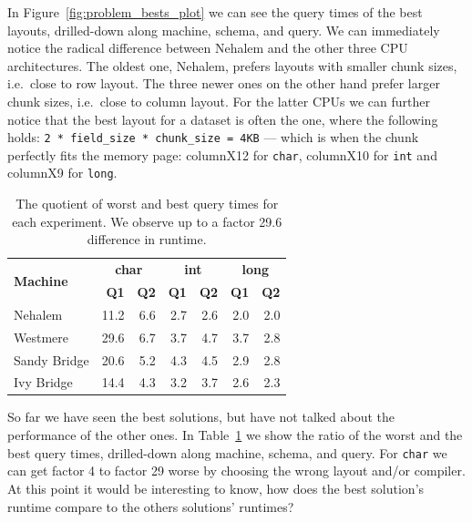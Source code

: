 \documentclass{sig-alternate}
\begin{document}
In Figure~\ref{fig:problem_bests_plot} we can see the query times of the best layouts, drilled-down along machine, schema, and query. We can immediately notice the radical difference between Nehalem and the other three CPU architectures. The oldest one, Nehalem, prefers layouts with smaller chunk sizes, i.e.~close to row layout. The three newer ones on the other hand prefer larger chunk sizes, i.e.~close to column layout. For the latter CPUs we can further notice that the best layout for a dataset is often the one, where the following holds: \texttt{2~* field\_size * chunk\_size = 4KB} --- which is when the chunk perfectly fits the memory page: columnX12 for \texttt{char}, columnX10 for \texttt{int} and columnX9 for \texttt{long}.

\begin{table}[!ht]
  \vspace{-10pt}
  \scriptsize
  \centering
  \begin{tabular}{| l || r | r | r | r | r | r |}
    \hline
\multirow{2}{*}{\bf Machine}  &  \multicolumn{2}{c|}{\bf char} &  \multicolumn{2}{c|}{\bf int} & \multicolumn{2}{c|}{\bf long} \\ \cline{2-7}
 & {\bf Q1} & {\bf Q2} & {\bf Q1} & {\bf Q2} & {\bf Q1} & {\bf Q2} \\ \hline \hline
Nehalem & 11.2 & 6.6 & 2.7 & 2.6 & 2.0 & 2.0 \\ \hline
Westmere & 29.6 & 6.7 & 3.7 & 4.7 & 3.7 & 2.8 \\ \hline
Sandy Bridge & 20.6 & 5.2 & 4.3 & 4.5 & 2.9 & 2.8 \\ \hline
Ivy Bridge & 14.4 & 4.3 & 3.2 & 3.7 & 2.6 & 2.3 \\ \hline
    \end{tabular}
    \vspace{-5pt}
    \caption{The quotient of worst and best query times for each experiment. We observe up to a factor 29.6 difference in runtime.}
    \label{tab:fragility}
    \vspace{-5pt}
    \end{table}
So far we have seen the best solutions, but have not talked about the performance of the other ones. In Table~\ref{tab:fragility} we show the ratio of the worst and the best query times, drilled-down along machine, schema, and query. For \texttt{char} we can get factor 4 to factor 29 worse by choosing the wrong layout and/or compiler. At this point it would be interesting to know, how does the best solution's runtime compare to the others solutions' runtimes?
\end{document}
